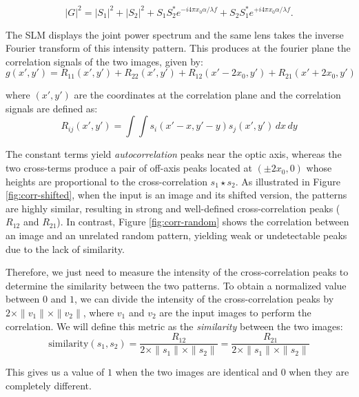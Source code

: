 \documentclass[twocolumn]{article} %
\begin{document}
\[
  |G|^{2}
  =|S_{1}|^{2}+|S_{2}|^{2}
   +S_{1}S_{2}^{\!*}e^{-i4\pi x_{0}\alpha/\lambda f}
   +S_{2}S_{1}^{\!*}e^{+i4\pi x_{0}\alpha/\lambda f}.
\]

The SLM displays the joint power spectrum and the same lens takes the inverse Fourier transform of this intensity
pattern. This produces at the fourier plane the correlation signals of the two images, given by:
$$
g(x', y') = R_{11}(x',y') + R_{22}(x',y') + R_{12}(x' - 2x_{0},y') + R_{21}(x' + 2x_{0},y')
$$

where $(x', y')$ are the coordinates at the correlation plane and the correlation signals are defined as:
\[
R_{ij}(x',y') = \int \int s_i(x' - x, y' - y)s_j(x', y') \, dx \, dy
\]

The constant terms yield \emph{autocorrelation}
peaks near the optic axis, whereas the two cross-terms produce a pair
of off-axis peaks located at \((\pm2x_{0},0)\) whose heights are
proportional to the cross-correlation
\(s_{1}\star s_{2}\). As illustrated in Figure \ref{fig:corr-shifted},
when the input is an image and its shifted version, the patterns are highly similar, resulting in strong and well-defined cross-correlation peaks ($R_{12}$ and $R_{21}$). In contrast, Figure \ref{fig:corr-random} shows the correlation between an image and an unrelated random pattern, yielding weak or undetectable peaks due to the lack of similarity.

Therefore, we just need to measure the intensity of the cross-correlation peaks to determine the similarity between the two patterns. To obtain a normalized value between $0$ and $1$, we can divide the intensity of the cross-correlation peaks by $2 \times \|v_1 \| \times \|v_2 \|$, where $v_1$ and $v_2$ are the input images to perform the correlation. We will define this metric as the \emph{similarity} between the two images:
\[
  \text{similarity}(s_1, s_2) = \frac{R_{12}}{2 \times \|s_1 \| \times \|s_2 \|} = \frac{R_{21}}{2 \times \|s_1 \| \times \|s_2 \|}
\]


This gives us a value of $1$ when the two images are identical and $0$ when they are completely different.
\end{document}
